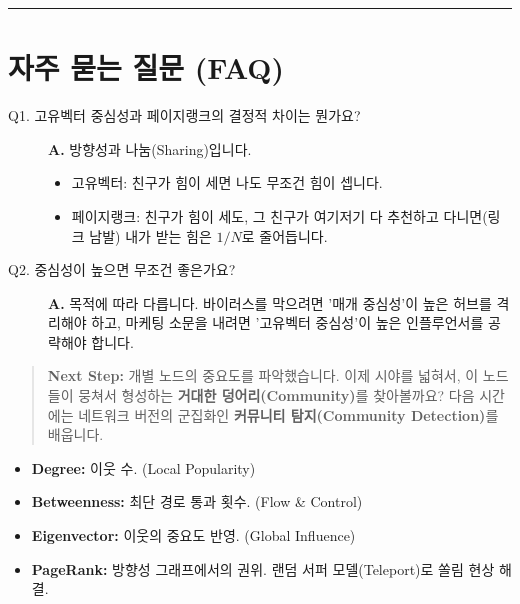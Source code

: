 \documentclass[11pt,a4paper]{book}
\theoremstyle{definition}
\begin{document}
\vspace{0.5cm}\hrule\vspace{0.5cm}

\section{자주 묻는 질문 (FAQ)}

\begin{description}
    \item[Q1. 고유벡터 중심성과 페이지랭크의 결정적 차이는 뭔가요?]
    \textbf{A.} 방향성과 나눔(Sharing)입니다.
    \begin{itemize}
        \item 고유벡터: 친구가 힘이 세면 나도 무조건 힘이 셉니다.
        \item 페이지랭크: 친구가 힘이 세도, 그 친구가 여기저기 다 추천하고 다니면(링크 남발) 내가 받는 힘은 $1/N$로 줄어듭니다.
    \end{itemize}
    
    \item[Q2. 중심성이 높으면 무조건 좋은가요?]
    \textbf{A.} 목적에 따라 다릅니다. 바이러스를 막으려면 '매개 중심성'이 높은 허브를 격리해야 하고, 마케팅 소문을 내려면 '고유벡터 중심성'이 높은 인플루언서를 공략해야 합니다.
\end{description}

\vspace{1cm}
\begin{quote}
\textbf{Next Step:} 개별 노드의 중요도를 파악했습니다. 이제 시야를 넓혀서, 이 노드들이 뭉쳐서 형성하는 \textbf{거대한 덩어리(Community)}를 찾아볼까요? 다음 시간에는 네트워크 버전의 군집화인 \textbf{커뮤니티 탐지(Community Detection)}를 배웁니다.
\end{quote}

\begin{summarybox}[title={Module 2 핵심 요약}]
\begin{itemize}
    \item \textbf{Degree:} 이웃 수. (Local Popularity)
    \item \textbf{Betweenness:} 최단 경로 통과 횟수. (Flow \& Control)
    \item \textbf{Eigenvector:} 이웃의 중요도 반영. (Global Influence)
    \item \textbf{PageRank:} 방향성 그래프에서의 권위. 랜덤 서퍼 모델(Teleport)로 쏠림 현상 해결.
\end{itemize}
\end{summarybox}
\end{document}
